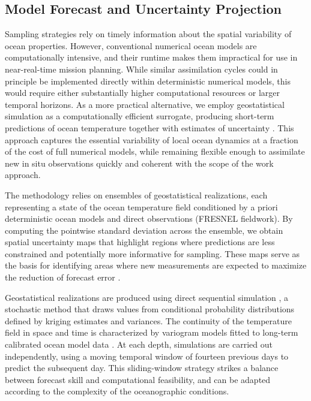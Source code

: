 \subsection{Model Forecast and Uncertainty Projection}
Sampling strategies rely on timely information about the spatial variability of ocean properties. However, conventional numerical ocean models are computationally intensive, and their runtime makes them impractical for use in near-real-time mission planning. While similar assimilation cycles could in principle be implemented directly within deterministic numerical models, this would require either substantially higher computational resources or larger temporal horizons. As a more practical alternative, we employ geostatistical simulation as a computationally efficient surrogate, producing short-term predictions of ocean temperature together with estimates of uncertainty \cite{deutsch1992}. This approach captures the essential variability of local ocean dynamics at a fraction of the cost of full numerical models, while remaining flexible enough to assimilate new in situ observations quickly \cite{Duarte2025} and coherent with the scope of the work approach.

The methodology relies on ensembles of geostatistical realizations, each representing a state of the ocean temperature field conditioned by a priori deterministic ocean models \cite{CMEMS2017} and direct observations (FRESNEL fieldwork). By computing the pointwise standard deviation across the ensemble, we obtain spatial uncertainty maps that highlight regions where predictions are less constrained and potentially more informative for sampling. These maps serve as the basis for identifying areas where new measurements are expected to maximize the reduction of forecast error \cite{Duarte2025}.   

Geostatistical realizations are produced using direct sequential simulation \cite{soares2001direct}, a stochastic method that draws values from conditional probability distributions defined by kriging estimates and variances. The continuity of the temperature field in space and time is characterized by variogram models fitted to long-term calibrated ocean model data \cite{CMEMS2017}. At each depth, simulations are carried out independently, using a moving temporal window of fourteen previous days to predict the subsequent day. This sliding-window strategy strikes a balance between forecast skill and computational feasibility, and can be adapted according to the complexity of the oceanographic conditions.

